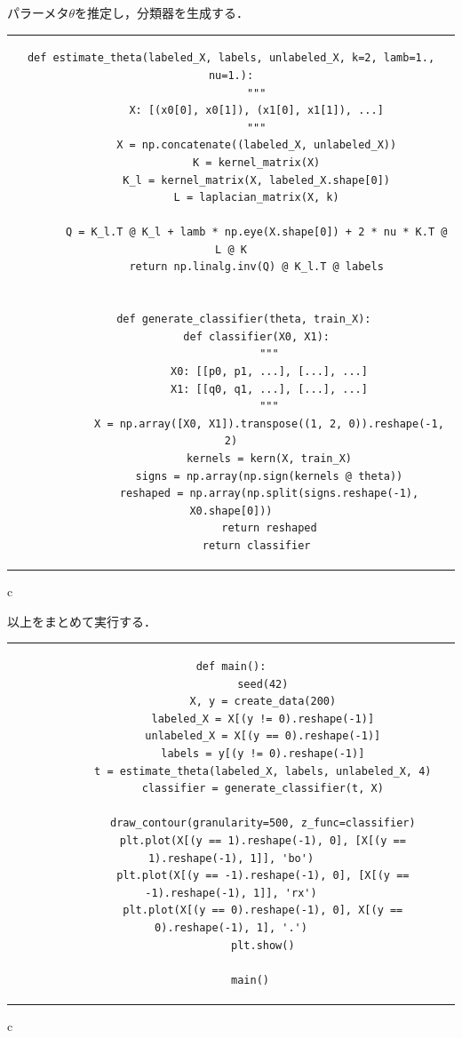 \documentclass[dvipdfmx]{jsarticle}
\begin{document}
パラーメタ$\theta$を推定し，分類器を生成する．
\begin{center}
  \begin{tabular}{c}
  \begin{lstlisting}[]
    def estimate_theta(labeled_X, labels, unlabeled_X, k=2, lamb=1., nu=1.):
        """
        X: [(x0[0], x0[1]), (x1[0], x1[1]), ...]
        """
        X = np.concatenate((labeled_X, unlabeled_X))
        K = kernel_matrix(X)
        K_l = kernel_matrix(X, labeled_X.shape[0])
        L = laplacian_matrix(X, k)

        Q = K_l.T @ K_l + lamb * np.eye(X.shape[0]) + 2 * nu * K.T @ L @ K
        return np.linalg.inv(Q) @ K_l.T @ labels


    def generate_classifier(theta, train_X):
        def classifier(X0, X1):
            """
            X0: [[p0, p1, ...], [...], ...]
            X1: [[q0, q1, ...], [...], ...]
            """
            X = np.array([X0, X1]).transpose((1, 2, 0)).reshape(-1, 2)
            kernels = kern(X, train_X)
            signs = np.array(np.sign(kernels @ theta))
            reshaped = np.array(np.split(signs.reshape(-1), X0.shape[0]))
            return reshaped
        return classifier
  \end{lstlisting}
\end{tabular}{c}
\end{center}

以上をまとめて実行する．
\begin{center}
  \begin{tabular}{c}
    \begin{lstlisting}[]
      def main():
          seed(42)
          X, y = create_data(200)
          labeled_X = X[(y != 0).reshape(-1)]
          unlabeled_X = X[(y == 0).reshape(-1)]
          labels = y[(y != 0).reshape(-1)]
          t = estimate_theta(labeled_X, labels, unlabeled_X, 4)
          classifier = generate_classifier(t, X)

          draw_contour(granularity=500, z_func=classifier)
          plt.plot(X[(y == 1).reshape(-1), 0], [X[(y == 1).reshape(-1), 1]], 'bo')
          plt.plot(X[(y == -1).reshape(-1), 0], [X[(y == -1).reshape(-1), 1]], 'rx')
          plt.plot(X[(y == 0).reshape(-1), 0], X[(y == 0).reshape(-1), 1], '.')
          plt.show()

      main()
    \end{lstlisting}
  \end{tabular}{c}
\end{center}
\end{document}
